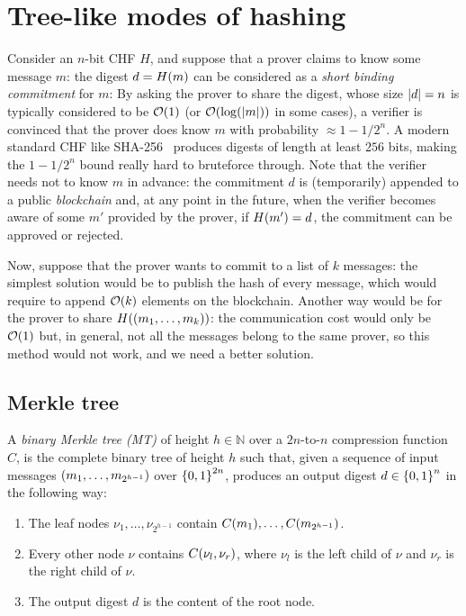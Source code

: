 \section{Tree-like modes of hashing}
Consider an \(n\)-bit CHF \(H\), and suppose that a prover claims to know some message \(m\): 
the digest \(d = \call{H}{m}\) can be considered as a \emph{short binding commitment} for \(m\): 
By asking the prover to share the digest, whose size \(\left\lvert d\right\rvert = n\) is typically considered to be 
\(\BigO{1}\) (or \(\BigO{\call{\log}{\abs{m}}}\) in some cases), a verifier is convinced that the 
prover does know \(m\) with probability \(\approx 1 - {1}/{2^n}\).
A modern standard CHF like SHA-256~\cite{Dang2015} produces digests of length at least \(256\) bits,
making the \(1 - {1}/{2^n}\) bound really hard to bruteforce through.
Note that the verifier needs not to know \(m\) in advance: the commitment \(d\) is (temporarily) 
appended to a public \emph{blockchain} and, at any point in the future, when the verifier becomes 
aware of some \(m'\) provided by the prover, if \(\call{H}{m'} = d\), the commitment can be 
approved or rejected.

Now, suppose that the prover wants to commit to a list of \(k\) messages: the simplest solution 
would be to publish the hash of every message, which would require to append \(\BigO{k}\) 
elements on the blockchain.
Another way would be for the prover to share \(\call{H}{\Tuple{m_1, \dots, m_k}}\): the 
communication cost would only be \(\BigO{1}\) but, in general, not all the messages belong to the 
same prover, so this method would not work, and we need a better solution.

\subsection{Merkle tree}
\begin{definition}
	A \emph{binary Merkle tree (MT)} of height \(h \in \mathbb{N}\) over a \(2n\)-to-\(n\) compression 
	function \(C\), is the complete binary tree of height \(h\) such that, given a sequence of input 
	messages \(\left(m_1, \dots, m_{2^{h-1}}\right)\) over \(\left\{0, 1\right\}^{2n}\), produces an
	output digest \(d \in \left\{0, 1\right\}^{n}\) in the following way:
	\begin{enumerate}
		\item The leaf nodes \(\nu_1, \dots, \nu_{2^{h-1}}\) contain 
					\(\call{C}{m_1}, \dots, \call{C}{m_{2^{h-1}}}\).
		\item Every other node \(\nu \) contains \(\call{C}{\nu_l, \nu_r}\), where \(\nu_l\) is
		      the left child of \(\nu \) and \(\nu_r\) is the right child of \(\nu \).
		\item The output digest \(d\) is the content of the root node. 
	\end{enumerate}
\end{definition}

